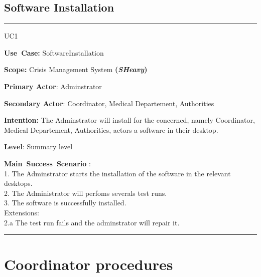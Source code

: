 \subsection{Software Installation}
\vspace{0.5cm}
\hrule
\vspace{0.5cm}
\begin{lyxlist}{UC1}
\small{
\item [\textbf{Use~Case:}] SoftwareInstallation
\item [\textbf{Scope:}] Crisis Management System \textbf{(\emph{SHeavy})}
\item [\textbf{Primary Actor}:] Adminstrator
\item [\textbf{Secondary Actor}:] Coordinator, Medical Departement, Authorities
\item [\textbf{Intention:}] The Adminstrator will install for the concerned,
namely  Coordinator, Medical Departement, Authorities, actors a software in
their desktop.
\item [\textbf{Level}:]Summary level
\item [\textbf{Main~Success~Scenario}]:\\
1. The Adminstrator starts the installation of the software in the relevant
desktops.\\
2. The Administrator will perfoms severals test runs.\\
3. The software is successfully installed.\\
Extensions:\\
2.a The test run fails and the adminstrator will repair it.\\
}
\end{lyxlist}
\hrule 
\vspace{0.5cm}


\section{Coordinator procedures}

